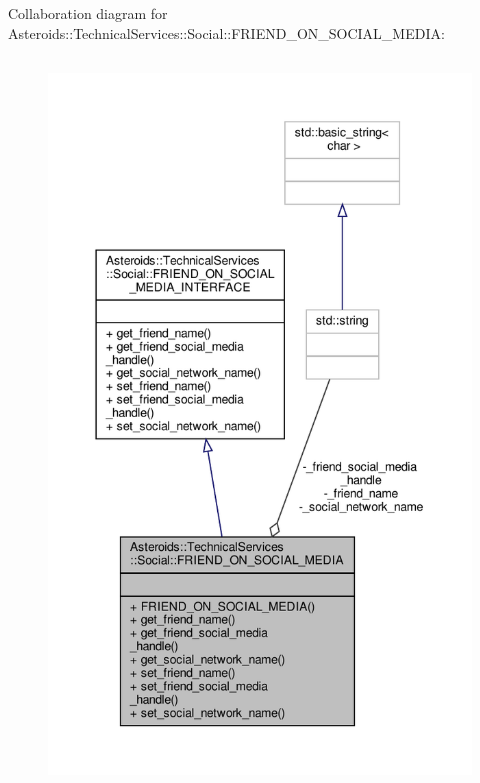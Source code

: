 Collaboration diagram for Asteroids\+:\+:Technical\+Services\+:\+:Social\+:\+:F\+R\+I\+E\+N\+D\+\_\+\+O\+N\+\_\+\+S\+O\+C\+I\+A\+L\+\_\+\+M\+E\+D\+IA\+:
\nopagebreak
\begin{figure}[H]
\begin{center}
\leavevmode
\includegraphics[height=550pt]{classAsteroids_1_1TechnicalServices_1_1Social_1_1FRIEND__ON__SOCIAL__MEDIA__coll__graph}
\end{center}
\end{figure}
